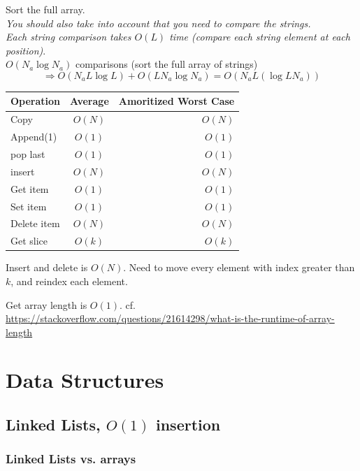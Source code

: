 \documentclass[10pt]{amsart}
\begin{document}
Sort the full array.\\
\emph{You should also take into account that you need to compare the strings.} \\
\emph{Each string comparison takes $O(L)$ time (compare each string element at each position)}. \\
$O(N_a \log{N_a})$ comparisons (sort the full array of strings) \\

\[
\Longrightarrow \boxed{ O(N_a L \log{L}) + O(L N_a \log{N_a}) = O(N_aL (\log{LN_a})) }
\]

\begin{center}
	\begin{tabular}{ l | c | r }
		\hline
		Operation & Average & Amoritized Worst Case \\ \hline
		Copy & $O(N)$ & $O(N)$ \\ \hline
		Append(1) & $O(1)$ & $O(1)$ \\ \hline
		pop last & $O(1)$ & $O(1)$ \\ \hline
		insert & $O(N)$ & $O(N)$ \\ \hline
		Get item & $O(1)$ & $O(1)$ \\ \hline
		Set item & $O(1)$ & $O(1)$ \\ \hline
		Delete item & $O(N)$ & $O(N)$ \\ \hline
		Get slice & $O(k)$ & $O(k)$ \\ \hline		
		\hline
	\end{tabular}
\end{center}

Insert and delete is $O(N)$. Need to move every element with index greater than $k$, and reindex each element.

Get array length is $O(1)$. cf. \url{https://stackoverflow.com/questions/21614298/what-is-the-runtime-of-array-length} 

\section{Data Structures}

\subsection{Linked Lists, $O(1)$ insertion}

\subsubsection{Linked Lists vs. arrays}
\end{document}
